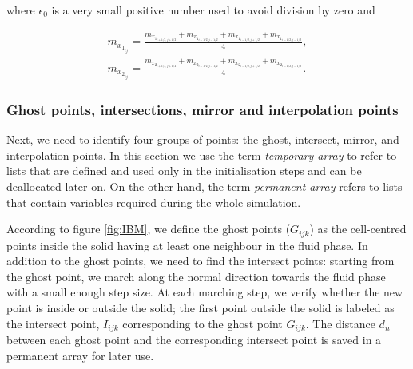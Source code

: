 \documentclass[review]{elsarticle}
\begin{document}
where $\epsilon_0$ is a very small positive number used to avoid division by zero and 
\begin{linenomath}\begin{equation} 
\begin{gathered}
 m_{x_{1_{ij}}} = \frac{m_{x_{1_{i+1/2,j+1/2}}}+m_{x_{1_{i+1/2,j-1/2}}}+m_{x_{1_{i-1/2,j+1/2}}}+m_{x_{1_{i-1/2,j-1/2}}}}{4},\\
 m_{x_{2_{ij}}} = \frac{m_{x_{2_{i+1/2,j+1/2}}}+m_{x_{2_{i+1/2,j-1/2}}}+m_{x_{2_{i-1/2,j+1/2}}}+m_{x_{2_{i-1/2,j-1/2}}}}{4}.
 \end{gathered}
\end{equation}\end{linenomath}

\subsubsection{Ghost points, intersections, mirror and interpolation points} \label{Sec:GhostIntersectMirror}
Next, we need to identify four groups of points: the ghost, intersect, mirror, and interpolation points. In this section we use the term \textit{temporary array} to refer to lists that are defined and used only in the initialisation steps and can be deallocated later on. On the other hand, the term \textit{permanent array} refers to lists that contain variables required during the whole simulation.

According to figure \ref{fig:IBM}, we define the ghost points ($G_{ijk}$) as the cell-centred points inside the solid having at least one neighbour in the fluid phase. In addition to the ghost points, we need to find the intersect points: starting from the ghost point, we march along the normal direction towards the fluid phase with a small enough step size. At each marching step, we verify whether the new point is inside or outside the solid; the first point outside the solid is labeled as the intersect point, $I_{ijk} $ corresponding to the ghost point $G_{ijk}$. The distance $d_n$ between each ghost point and the corresponding intersect point is saved in a permanent array for later use.
\end{document}
